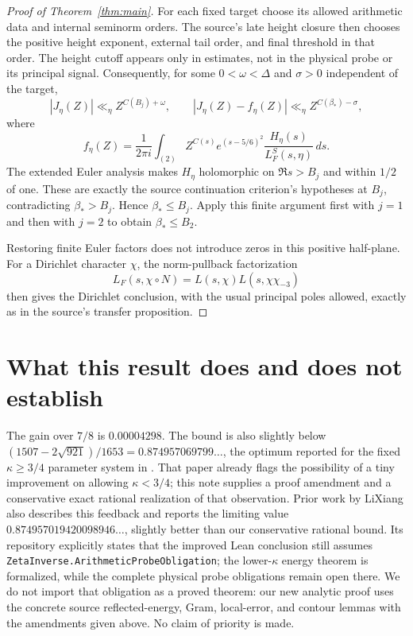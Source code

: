 \documentclass[11pt]{article}
\newcommand{\Bstar}{\beta_*}
\begin{document}
\begin{proof}[Proof of Theorem~\ref{thm:main}]
For each fixed target choose its allowed arithmetic data and internal
seminorm orders. The source's late height closure then chooses the
positive height exponent, external tail order, and final threshold in
that order. The height cutoff appears only in estimates, not in the
physical probe or its principal signal. Consequently, for some
$0<\omega<\Delta$ and $\sigma>0$ independent of the target,
\[
 |J_\eta(Z)|\ll_\eta Z^{C(B_j)+\omega},\qquad
 |J_\eta(Z)-f_\eta(Z)|\ll_\eta Z^{C(\Bstar)-\sigma},
\]
where
\[
 f_\eta(Z)=\frac1{2\pi i}\int_{(2)}
 Z^{C(s)}e^{(s-5/6)^2}\frac{H_\eta(s)}{L_F^S(s,\eta)}\,ds.
\]
The extended Euler analysis makes $H_\eta$ holomorphic on
$\Re s>B_j$ and within $1/2$ of one. These are exactly the source
continuation criterion's hypotheses at $B_j$, contradicting
$\Bstar>B_j$. Hence $\Bstar\le B_j$. Apply this finite argument first
with $j=1$ and then with $j=2$ to obtain $\Bstar\le B_2$.

Restoring finite Euler factors does not introduce zeros in this positive
half-plane. For a Dirichlet character $\chi$, the norm-pullback factorization
\[
 L_F(s,\chi\circ N)=L(s,\chi)L(s,\chi\chi_{-3})
\]
then gives the Dirichlet conclusion, with the usual principal poles
allowed, exactly as in the source's transfer proposition.
\end{proof}

\section{What this result does and does not establish}

The gain over $7/8$ is $0.00004298$. The bound is also slightly below
$(1507-2\sqrt{921})/1653=0.874957069799\ldots$, the optimum reported
for the fixed $\kappa\ge3/4$ parameter system in \cite{liu}.
That paper already flags the possibility of a tiny improvement on allowing
$\kappa<3/4$; this note supplies a proof amendment and a conservative exact
rational realization of that observation. Prior work by LiXiang
\cite{lixiang} also describes this feedback and reports the limiting
value $0.874957019420098946\ldots$, slightly better than our conservative
rational bound. Its repository explicitly states that the improved Lean
conclusion still assumes \texttt{ZetaInverse.ArithmeticProbeObligation};
the lower-$\kappa$ energy theorem is formalized, while the complete physical
probe obligations remain open there. We do not import that obligation as
a proved theorem: our new analytic proof uses the concrete source
reflected-energy, Gram, local-error, and contour lemmas with the amendments
given above. No claim of priority is made.
\end{document}
